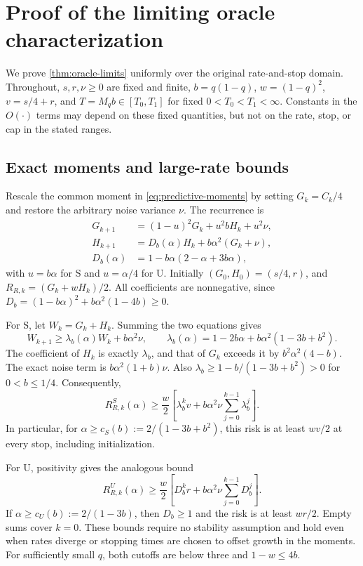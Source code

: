\documentclass{alt2027}
\begin{document}
\section{Proof of the limiting oracle characterization}
\label{sec:oracle-limit-proofs}

We prove \cref{thm:oracle-limits} uniformly over the original rate-and-stop
domain. Throughout, $s,r,\nu \geq 0$ are fixed and finite, $b = q(1 - q)$,
$w = (1 - q)^2$, $v = s/4 + r$, and $T = M_qb \in[T_0,T_1]$ for fixed
$0 < T_0 < T_1 < \infty$. Constants in the $O(\cdot)$ terms may depend on these
fixed quantities, but not on the rate, stop, or cap in the stated ranges.

\subsection{Exact moments and large-rate bounds}

Rescale the common moment in \cref{eq:predictive-moments} by setting
$G_k = C_k/4$ and restore the arbitrary noise variance $\nu$. The recurrence is
\begin{equation}
  \begin{aligned}
    G_{k+1}     & = (1 - u)^2G_k + u^2bH_k + u^2\nu,       \\
    H_{k+1}     & = D_b(\alpha)H_k + b\alpha^2(G_k + \nu), \\
    D_b(\alpha) & = 1 - b\alpha(2 - \alpha + 3b\alpha),
  \end{aligned}
\end{equation}
with $u = b\alpha$ for S and $u = \alpha/4$ for U. Initially
$(G_0,H_0) = (s/4,r)$, and $R_{R,k} = (G_k + wH_k)/2$. All coefficients are
nonnegative, since $D_b = (1 - b\alpha)^2 + b\alpha^2(1 - 4b) \geq 0$.

For S, let $W_k = G_k + H_k$. Summing the two equations gives
\[
  W_{k+1} \geq \lambda_b(\alpha)W_k + b\alpha^2\nu, \qquad \lambda_b(\alpha)
          =    1 - 2b\alpha + b\alpha^2(1 - 3b + b^2).
\]
The coefficient of $H_k$ is exactly $\lambda_b$, and that of $G_k$ exceeds it by
$b^2\alpha^2(4 - b)$. The exact noise term is $b\alpha^2(1 + b)\nu$. Also
$\lambda_b \geq 1 - b/(1 - 3b + b^2) > 0$ for $0 < b \leq 1/4$. Consequently,
\[
  R^S_{R,k}(\alpha) \geq \frac w2\left[ \lambda_b^kv + b\alpha^2\nu\sum_{j=0}^{k-1}\lambda_b^j \right].
\]
In particular, for $\alpha \geq c_S(b) := 2/(1 - 3b + b^2)$, this risk is at
least $wv/2$ at every stop, including initialization.

For U, positivity gives the analogous bound
\[
  R^U_{R,k}(\alpha) \geq \frac w2\left[ D_b^kr + b\alpha^2\nu\sum_{j=0}^{k-1}D_b^j \right].
\]
If $\alpha \geq c_U(b) := 2/(1 - 3b)$, then $D_b \geq 1$ and the risk is at
least $wr/2$. Empty sums cover $k = 0$. These bounds require no stability
assumption and hold even when rates diverge or stopping times are chosen to
offset growth in the moments. For sufficiently small $q$, both cutoffs are below
three and $1 - w \leq 4b$.
\end{document}
